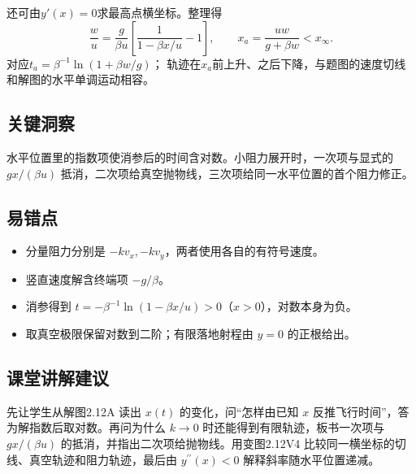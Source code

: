 \documentclass[UTF8,fontset=fandol,a4paper,11pt]{ctexart}
\begin{document}
还可由$y'(x)=0$求最高点横坐标。整理得
\[
\frac wu=\frac g{\beta u}
\left[\frac1{1-\beta x/u}-1\right],
\qquad x_a=\frac{uw}{g+\beta w}<x_\infty.
\]
对应$t_a=\beta^{-1}\ln(1+\beta w/g)$；
轨迹在$x_a$前上升、之后下降，与题图的速度切线和解图的水平单调运动相容。




\subsection*{关键洞察}

水平位置里的指数项使消参后的时间含对数。小阻力展开时，一次项与显式的 $gx/(\beta u)$ 抵消，二次项给真空抛物线，三次项给同一水平位置的首个阻力修正。



\subsection*{易错点}

\begin{itemize}
\item 分量阻力分别是 $-kv_x,-kv_y$，两者使用各自的有符号速度。
\item 竖直速度解含终端项 $-g/\beta$。
\item 消参得到 $t=-\beta^{-1}\ln(1-\beta x/u)>0$（$x>0$），对数本身为负。
\item 取真空极限保留对数到二阶；有限落地射程由 $y=0$ 的正根给出。
\end{itemize}



\subsection*{课堂讲解建议}

先让学生从解图2.12A 读出 $x(t)$ 的变化，问“怎样由已知 $x$ 反推飞行时间”，答为解指数后取对数。再问为什么 $k\to0$ 时还能得到有限轨迹，板书一次项与 $gx/(\beta u)$ 的抵消，并指出二次项给抛物线。用变图2.12V4 比较同一横坐标的切线、真空轨迹和阻力轨迹，最后由 $y^{\prime\prime}(x)<0$ 解释斜率随水平位置递减。


\end{document}
